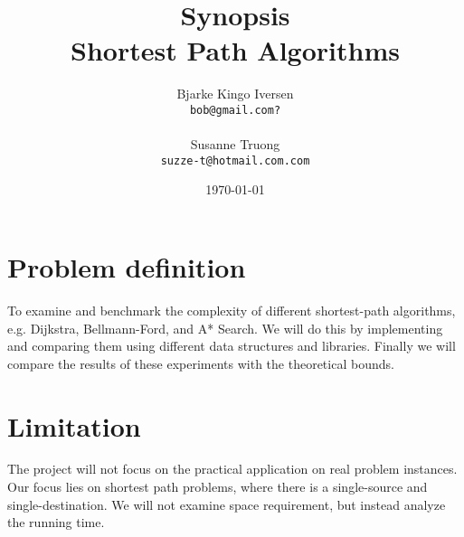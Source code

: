 \documentclass[11pt]{article}
\title{
  \vspace{3cm}
  \Huge{Synopsis} \\
  \Large{Shortest Path Algorithms}
}
\author{
  \Large{Bjarke Kingo Iversen}
  \\ \texttt{bob@gmail.com?} \\\\
  \Large{Susanne Truong}
  \\ \texttt{suzze-t@hotmail.com.com}
}
\date{
    \today
}
\def \ColourPDF {include/ku-farve}
\def \TitlePDF   {include/ku-en}  %
\begin{document}


\clearpage\maketitle
\thispagestyle{empty}

\newpage

\section{Problem definition}
To examine and benchmark the complexity of different shortest-path algorithms, e.g. Dijkstra, Bellmann-Ford, and A* Search. We will do this by implementing and comparing them using different data structures and libraries. Finally we will compare the results of these experiments with the theoretical bounds.
\section{Limitation}
The project will not focus on the practical application on real problem instances. Our focus lies on shortest path problems, where there is a single-source and single-destination. We will not examine space requirement, but instead analyze the running time.
\end{document}
